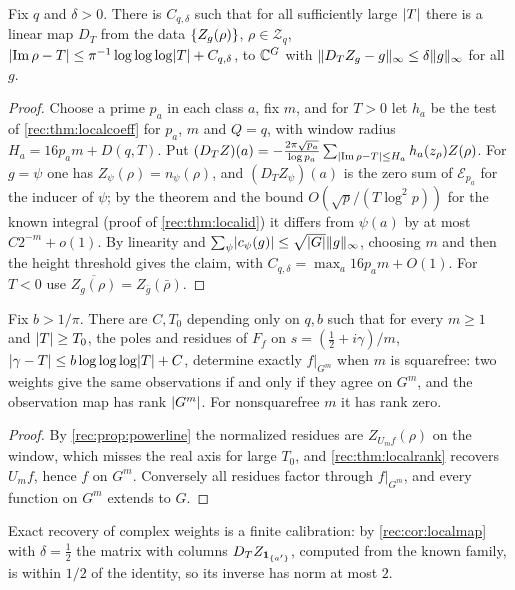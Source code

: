 \begin{corollary}\label{rec:cor:localmap}
Fix $q$ and $\delta>0$. There is $C_{q,\delta}$ such that for all sufficiently large $\lvert T\rvert$ there is a linear
map $D_T$ from the data $\{Z_g(\rho)\}$, $\rho\in\mathcal Z_q$, $\lvert\operatorname{Im}\rho-T\rvert\le\pi^{-1}\log\log\log\lvert T\rvert+C_{q,\delta}$, to
$\mathbb{C}^G$ with $\lVert D_TZ_g-g\rVert_\infty\le\delta\lVert g\rVert_\infty$ for all $g$.
\end{corollary}

\begin{proof}
Choose a prime $p_a$ in each class $a$, fix $m$, and for $T>0$ let $h_a$ be the test of
\cref{rec:thm:localcoeff} for $p_a$, $m$ and $Q=q$, with window radius $H_a=16p_am+D(q,T)$. Put
$(D_TZ)(a)=-\frac{2\pi\sqrt{p_a}}{\log p_a}\sum_{\lvert\operatorname{Im}\rho-T\rvert\le H_a}h_a(z_\rho)Z(\rho)$. For $g=\psi$ one has
$Z_\psi(\rho)=n_\psi(\rho)$, and $(D_TZ_\psi)(a)$ is the zero sum of $\mathcal E_{p_a}$ for the inducer of $\psi$; by the
theorem and the bound $O(\sqrt p/(T\log^2p))$ for the known integral (proof of \cref{rec:thm:localid}) it
differs from $\psi(a)$ by at most $C2^{-m}+o(1)$. By linearity and
$\sum_\psi\lvert c_\psi(g)\rvert\le\sqrt{\lvert G\rvert}\lVert g\rVert_\infty$, choosing $m$ and then the height threshold gives the claim, with
$C_{q,\delta}=\max_a16p_am+O(1)$. For $T<0$ use $\overline{Z_g(\rho)}=Z_{\bar g}(\bar\rho)$.
\end{proof}

\begin{theorem}\label{rec:thm:localrecovery}
Fix $b>1/\pi$. There are $C,T_0$ depending only on $q,b$ such that for every $m\ge1$ and
$\lvert T\rvert\ge T_0$, the poles and residues of $F_f$ on $s=(\tfrac12+i\gamma)/m$,
$\lvert\gamma-T\rvert\le b\log\log\log\lvert T\rvert+C$, determine exactly $f|_{G^m}$ when $m$ is squarefree: two
weights give the same observations if and only if they agree on $G^m$, and the observation map has
rank $\lvert G^m\rvert$. For nonsquarefree $m$ it has rank zero.
\end{theorem}

\begin{proof}
By \cref{rec:prop:powerline} the normalized residues are $Z_{U_mf}(\rho)$ on the window, which
misses the real axis for large $T_0$, and \cref{rec:thm:localrank} recovers $U_mf$, hence $f$ on
$G^m$. Conversely all residues factor through $f|_{G^m}$, and every function on $G^m$ extends to $G$.
\end{proof}

Exact recovery of complex weights is a finite calibration: by \cref{rec:cor:localmap} with
$\delta=\tfrac12$ the matrix with columns $D_TZ_{\mathbf 1_{\{a'\}}}$, computed from the known family, is within
$1/2$ of the identity, so its inverse has norm at most $2$.

